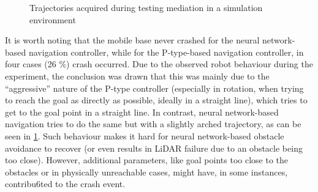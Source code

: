 \begin{figure}
    \centering
    \hfill
    \caption{Trajectories acquired during testing mediation in a simulation environment}
    \label{fig:SimulationTest}
\end{figure}

It is worth noting that the mobile base never crashed for the neural network-based navigation controller, while for the P-type-based navigation controller, in four cases (26 \%) crash occurred. Due to the observed robot behaviour during the experiment, the conclusion was drawn that this was mainly due to the ``aggressive'' nature of the P-type controller (especially in rotation, when trying to reach the goal as directly as possible, ideally in a straight line), which tries to get to the goal point in a straight line. In contrast, neural network-based navigation tries to do the same but with a slightly arched trajectory, as can be seen in \cref{fig:SimulationTest}. Such behaviour makes it hard for neural network-based obstacle avoidance to recover (or even results in LiDAR failure due to an obstacle being too close). However, additional parameters, like goal points too close to the obstacles or in physically unreachable cases, might have, in some instances, contribu6ted to the crash event. 

